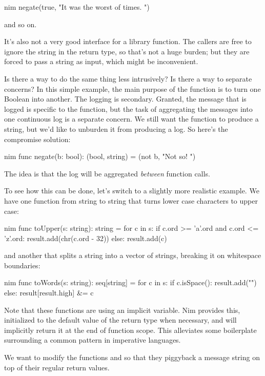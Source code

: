 \begin{snip}{nim}
negate(true, "It was the worst of times. ")
\end{snip}
and so on.

It's also not a very good interface for a library function. The callers
are free to ignore the string in the return type, so that's not a huge
burden; but they are forced to pass a string as input, which might be
inconvenient.

Is there a way to do the same thing less intrusively? Is there a way to
separate concerns? In this simple example, the main purpose of the
function  is to turn one Boolean into another. The
logging is secondary. Granted, the message that is logged is specific to
the function, but the task of aggregating the messages into one
continuous log is a separate concern. We still want the function to
produce a string, but we'd like to unburden it from producing a log. So
here's the compromise solution:

\begin{snip}{nim}
func negate(b: bool): (bool, string) = (not b, "Not so! ")
\end{snip}
The idea is that the log will be aggregated \emph{between} function
calls.

To see how this can be done, let's switch to a slightly more realistic
example. We have one function from string to string that turns lower
case characters to upper case:

\begin{snip}{nim}
func toUpper(s: string): string =
  for c in s:
    if c.ord >= 'a'.ord and c.ord <= 'z'.ord:
      result.add(chr(c.ord - 32))
    else:
      result.add(c)
\end{snip}
and another that splits a string into a vector of strings, breaking it
on whitespace boundaries:

\begin{snip}{nim}
func toWords(s: string): seq[string] =
  for c in s:
    if c.isSpace():
      result.add("")
    else:
      result[result.high] &= c
\end{snip}
Note that these functions are using an implicit  variable.
Nim provides this, initialized to the default value of the return type
when necessary, and will implicitly return it at the end of function scope.
This alleviates some boilerplate surrounding a common pattern in imperative
languages.

We want to modify the functions  and  so
that they piggyback a message string on top of their regular return
values.

